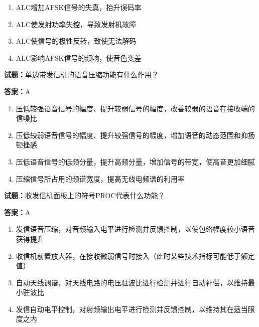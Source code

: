 \documentclass{ctexbook}
\begin{document}
\begin{enumerate}[leftmargin=3em]
  \item ALC增加AFSK信号的失真，抬升误码率 

  \item ALC使发射功率失控，导致发射机故障 

  \item ALC使信号的极性反转，致使无法解码 

  \item ALC影响AFSK信号的频响，使音色变差 

\end{enumerate}





\vspace{1em}

\textbf{试题：}单边带发信机的语音压缩功能有什么作用？ 

\textbf{答案：}A 

\begin{enumerate}[leftmargin=3em]
  \item 压低较强语音信号的幅度、提升较弱信号的幅度，改善较弱的语音在接收端的信噪比 

  \item 压低较弱语音信号的幅度、提升较强信号的幅度，增加语音的动态范围和抑扬顿挫感 

  \item 压低语音信号的低频分量，提升高频分量，增加信号的带宽，使高音更加细腻 

  \item 压缩信号所占用的频谱宽度，提高无线电频谱的利用率 

\end{enumerate}






\vspace{1em}

\textbf{试题：}收发信机面板上的符号PROC代表什么功能？ 

\textbf{答案：}A 

\begin{enumerate}[leftmargin=3em]
  \item 发信语音压缩，对音频输入电平进行检测并反馈控制，以使包络幅度较小语音获得提升 

  \item 收信机前置放大器，在接收微弱信号时接入（此时某些技术指标可能低于额定值） 

  \item 自动天线调谐，对天线电路的电压驻波比进行检测并进行自动补偿，以维持最小驻波比 

  \item 发信自动电平控制，对射频输出电平进行检测并反馈控制，以维持其在适当限度之内 

\end{enumerate}
\end{document}

